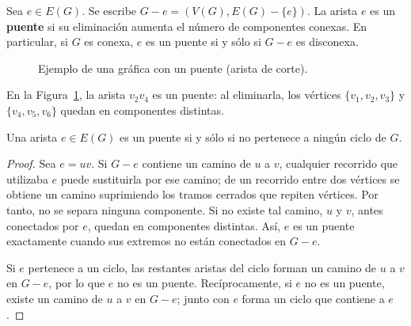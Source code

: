 \begin{definition}[Puente]
\label{def:puente}
Sea $e\in E(G)$. Se escribe $G-e=(V(G),E(G)-\{e\})$. La arista $e$ es un \textbf{puente} si su eliminación aumenta el número de componentes conexas. En particular, si $G$ es conexa, $e$ es un puente si y sólo si $G-e$ es disconexa.
\end{definition}

 \begin{figure}[H]
    \centering
    \caption{Ejemplo de una gráfica con un puente (arista de corte).}
    \label{fig:puente}
\end{figure}
 
En la Figura~\ref{fig:puente}, la arista $v_2v_4$ es un puente: al eliminarla, los vértices $\{v_1,v_2,v_3\}$ y $\{v_4,v_5,v_6\}$ quedan en componentes distintas.

\begin{proposition}
\label{prop:puentes-ciclos}
Una arista $e\in E(G)$ es un puente si y sólo si no pertenece a ningún ciclo de $G$.
\end{proposition}
\begin{proof}
Sea $e=uv$. Si $G-e$ contiene un camino de $u$ a $v$, cualquier recorrido que utilizaba $e$ puede sustituirla por ese camino; de un recorrido entre dos vértices se obtiene un camino suprimiendo los tramos cerrados que repiten vértices. Por tanto, no se separa ninguna componente. Si no existe tal camino, $u$ y $v$, antes conectados por $e$, quedan en componentes distintas. Así, $e$ es un puente exactamente cuando sus extremos no están conectados en $G-e$.

Si $e$ pertenece a un ciclo, las restantes aristas del ciclo forman un camino de $u$ a $v$ en $G-e$, por lo que $e$ no es un puente. Recíprocamente, si $e$ no es un puente, existe un camino de $u$ a $v$ en $G-e$; junto con $e$ forma un ciclo que contiene a $e$.
\end{proof}

